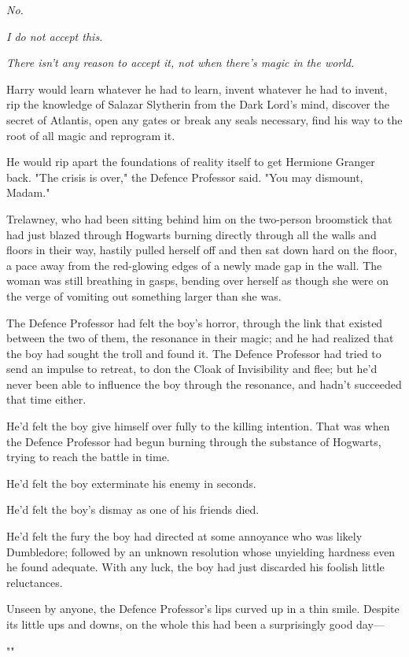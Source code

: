 \emph{No.}

\emph{I do not accept this.}

\emph{There isn't any reason to accept it, not when there's magic in the world.}

Harry would learn whatever he had to learn, invent whatever he had to invent,
rip the knowledge of Salazar Slytherin from the Dark Lord's mind, discover the
secret of Atlantis, open any gates or break any seals necessary, find his way
to the root of all magic and reprogram it.

He would rip apart the foundations of reality itself to get Hermione Granger
back.
\later
"The crisis is over," the Defence Professor said. "You may dismount, Madam."

Trelawney, who had been sitting behind him on the two-person broomstick that
had just blazed through Hogwarts burning directly through all the walls and
floors in their way, hastily pulled herself off and then sat down hard on the
floor, a pace away from the red-glowing edges of a newly made gap in the wall.
The woman was still breathing in gasps, bending over herself as though she were
on the verge of vomiting out something larger than she was.

The Defence Professor had felt the boy's horror, through the link that existed
between the two of them, the resonance in their magic; and he had realized that
the boy had sought the troll and found it. The Defence Professor had tried to
send an impulse to retreat, to don the Cloak of Invisibility and flee; but he'd
never been able to influence the boy through the resonance, and hadn't
succeeded that time either.

He'd felt the boy give himself over fully to the killing intention. That was
when the Defence Professor had begun burning through the substance of Hogwarts,
trying to reach the battle in time.

He'd felt the boy exterminate his enemy in seconds.

He'd felt the boy's dismay as one of his friends died.

He'd felt the fury the boy had directed at some annoyance who was likely
Dumbledore; followed by an unknown resolution whose unyielding hardness even he
found adequate. With any luck, the boy had just discarded his foolish little
reluctances.

Unseen by anyone, the Defence Professor's lips curved up in a thin smile.
Despite its little ups and downs, on the whole this had been a surprisingly
good day---

""
